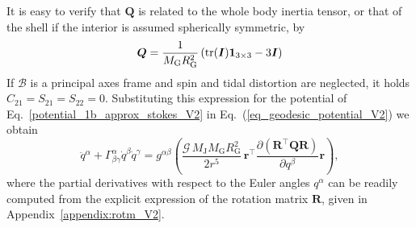 \documentclass[pdflatex,sn-mathphys-num]{sn-jnl}%
\theoremstyle{thmstyleone}%
\theoremstyle{thmstyletwo}%
\theoremstyle{thmstylethree}%
\renewcommand{\vec}[1]{\boldsymbol{#1}}
\begin{document}
%
It is easy to verify that $\vec{Q}$ is related to the whole body inertia tensor, or that of the shell if the interior is assumed spherically symmetric, by
\begin{equation}\label{eq:Q2I_V2}
	\vec{Q} =
	 \frac{1}{M_{\mathrm{G}}R_\mathrm{G}^2}\left( \tr(\vec{I})\vec{1}_{3\times 3} - 3 \vec{I} \right)
\end{equation} 
%
If $\mathcal{B}$ is a principal axes frame and spin and tidal distortion are neglected, it holds ${C_{21} = S_{21} = S_{22} = 0}$.
%
Substituting this expression for the potential of Eq.~\eqref{potential_1b_approx_stokes_V2} in Eq.~(\ref{eq_geodesic_potential_V2}) we obtain 
%
\begin{equation}\label{eq:geodesic_explicit_V2}
	\ddot{q}^\alpha + 
	\Gamma^{\alpha}_{\beta\gamma} \dot{q}^\beta \dot{q}^\gamma =
	g^{\alpha\beta}
	\left(  
	\frac{\mathcal{G} \, M_{\mathrm{J}} M_{\mathrm{G}}R_\mathrm{G}^2 }{2 r^5}  \,
	\vec{r}^\top  \frac{\partial (\vec{R}^\top \vec{Q} \vec{R})}{\partial q^\beta} 
	{\vec{r}} 
	\right), %
\end{equation}
%
where the partial derivatives with respect to the Euler angles $q^\alpha$ can be readily computed from the explicit expression of the rotation matrix $\vec{R}$, given in Appendix~\ref{appendix:rotm_V2}.
%
\end{document}
